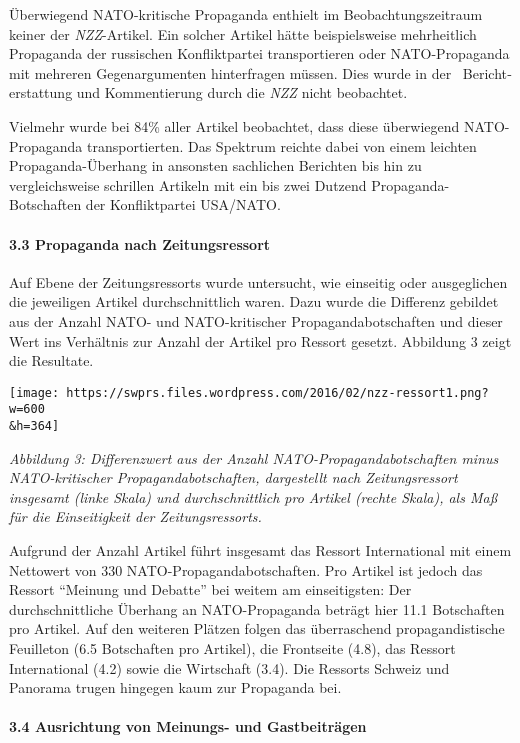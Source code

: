 Überwiegend NATO-kritische Propaganda enthielt im Beobachtungszeitraum
keiner der \emph{NZZ}-Artikel. Ein solcher Artikel hätte beispielsweise
mehrheitlich Propaganda der russischen Konfliktpartei transportieren
oder NATO-Propaganda mit mehreren Gegen­argumenten hinterfragen müssen.
Dies wurde in der~ Bericht­erstattung und Kommentierung durch die
\emph{NZZ} nicht beobachtet.

Vielmehr wurde bei 84\% aller Artikel beobachtet, dass diese überwiegend
NATO-Propaganda transportierten. Das Spektrum reichte dabei von einem
leichten Propaganda-Überhang in ansonsten sachlichen Berichten bis hin
zu vergleichsweise schrillen Artikeln mit ein bis zwei Dutzend
Propaganda-Botschaften der Konfliktpartei USA/NATO.

\hypertarget{33-propaganda-nach-zeitungsressort}{%
\paragraph{3.3 Propaganda nach
Zeitungsressort}\label{33-propaganda-nach-zeitungsressort}}

Auf Ebene der Zeitungsressorts wurde untersucht, wie einseitig oder
ausgeglichen die jeweiligen Artikel durchschnittlich waren. Dazu wurde
die Differenz gebildet aus der Anzahl NATO- und NATO-kritischer
Propagandabotschaften und dieser Wert ins Verhältnis zur Anzahl der
Artikel pro Ressort gesetzt. Abbildung 3 zeigt die Resultate.

\texttt{[image: https://swprs.files.wordpress.com/2016/02/nzz-ressort1.png?w=600\\\&h=364]}

\emph{Abbildung 3: Differenzwert aus der Anzahl
NATO-Propagandabotschaften minus NATO-kritischer Propagandabotschaften,
dargestellt nach Zeitungsressort insgesamt (linke Skala) und
durch­schnitt­lich pro Artikel (rechte Skala), als Maß für die
Einseitigkeit der Zeitungsressorts.}

Aufgrund der Anzahl Artikel führt insgesamt das Ressort International
mit einem Nettowert von 330 NATO-Propagandabotschaften. Pro Artikel ist
jedoch das Ressort ``Meinung und Debatte'' bei weitem am einseitigsten:
Der durchschnittliche Überhang an NATO-Propaganda beträgt hier 11.1
Botschaften pro Artikel. Auf den weiteren Plätzen folgen das
überraschend propagandistische Feuilleton (6.5 Botschaften pro Artikel),
die Frontseite (4.8), das Ressort International (4.2) sowie die
Wirtschaft (3.4). Die Ressorts Schweiz und Panorama trugen hingegen kaum
zur Propaganda bei.

\hypertarget{34-ausrichtung-von-meinungs--und-gastbeitruxe4gen}{%
\paragraph{3.4 Ausrichtung von Meinungs- und
Gastbeiträgen}\label{34-ausrichtung-von-meinungs--und-gastbeitruxe4gen}}

